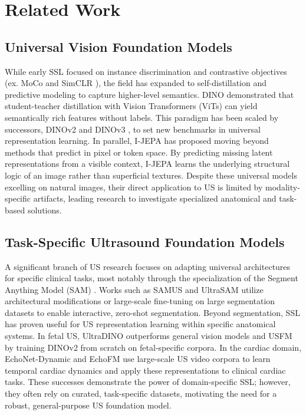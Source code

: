 \documentclass{article}
\theoremstyle{plain}
\theoremstyle{definition}
\theoremstyle{remark}
\begin{document}
\section{Related Work}

\subsection{Universal Vision Foundation Models}

While early SSL focused on instance discrimination and contrastive objectives (ex. MoCo \cite{he_momentum_2020} and SimCLR \cite{chen_simple_2020}), the field has expanded to self-distillation and predictive modeling to capture higher-level semantics. DINO \cite{caron_emerging_2021} demonstrated that student-teacher distillation with Vision Transformers (ViTs) can yield semantically rich features without labels. This paradigm has been scaled by successors, DINOv2 \cite{oquab_dinov2_2024} and DINOv3 \cite{simeoni_dinov3_2025}, to set new benchmarks in universal representation learning. In parallel, I-JEPA \cite{assran_self-supervised_2023} has proposed moving beyond methods that predict in pixel or token space. By predicting missing latent representations from a visible context, I-JEPA learns the underlying structural logic of an image rather than superficial textures. Despite these universal models excelling on natural images, their direct application to US is limited by modality-specific artifacts, leading research to investigate specialized anatomical and task-based solutions.

\subsection{Task-Specific Ultrasound Foundation Models}

A significant branch of US research focuses on adapting universal architectures for specific clinical tasks, most notably through the specialization of the Segment Anything Model (SAM) \cite{kirillov_segment_2023}. Works such as SAMUS \cite{linguraru_beyond_2024} and UltraSAM \cite{meyer_ultrasam_2025} utilize architectural modifications or large-scale fine-tuning on large segmentation datasets to enable interactive, zero-shot segmentation. Beyond segmentation, SSL has proven useful for US representation learning within specific anatomical systems. In fetal US, UltraDINO \cite{ambsdorf_general_2025} outperforms general vision models and USFM by training DINOv2 from scratch on fetal-specific corpora. In the cardiac domain, EchoNet-Dynamic and EchoFM \cite{ouyang_video-based_2020, kim_echofm_2025} use large-scale US video corpora to learn temporal cardiac dynamics and apply these representations to clinical cardiac tasks. These successes demonstrate the power of domain-specific SSL; however, they often rely on curated, task-specific datasets, motivating the need for a robust, general-purpose US foundation model.
\end{document}
